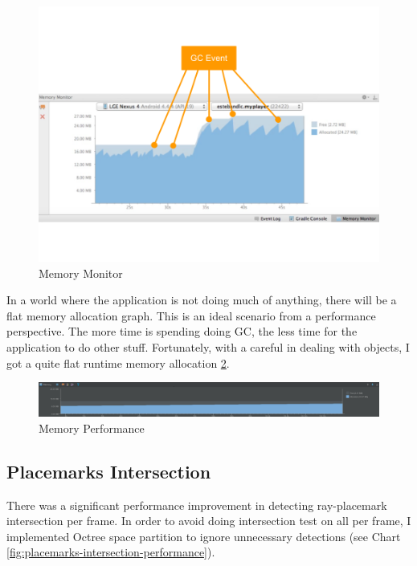 \begin{figure}[H]
	\caption[Memory Monitor]{Memory Monitor \cite{google.memory-monitor.2015}}
	\label{fig:memory-monitor}
	\centering
	\includegraphics[width=\textwidth, keepaspectratio]{Figures/memory-monitor.png}
	\decoRule
\end{figure}

In a world where the application is not doing much of anything, there will be a flat memory allocation graph. This is an ideal scenario from a performance perspective. The more time is spending doing GC, the less time for the application to do other stuff. Fortunately, with a careful in dealing with objects, I got a quite flat runtime memory allocation \ref{fig:memory-performance}.

\begin{figure}[H]
	\caption{Memory Performance}
	\label{fig:memory-performance}
	\centering
	\includegraphics[width=\textwidth, keepaspectratio]{Figures/memory-performance.png}
	\decoRule
\end{figure}

\subsection{Placemarks Intersection}
\label{section-placemarks-intersection}

There was a significant performance improvement in detecting ray-placemark intersection per frame. In order to avoid doing intersection test on all  per frame, I implemented Octree space partition to ignore unnecessary detections (see Chart \ref{fig:placemarks-intersection-performance}).

